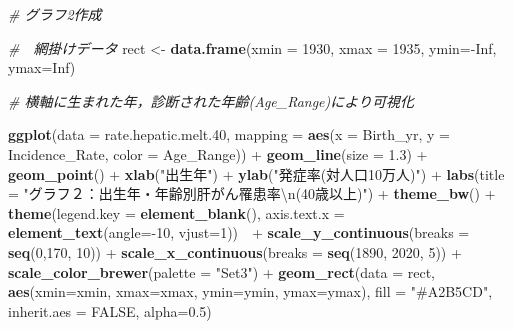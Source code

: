 \documentclass[11pt,]{article}
\newenvironment{Shaded}{\begin{snugshade}}{\end{snugshade}}
\newcommand{\KeywordTok}[1]{\textcolor[rgb]{0.13,0.29,0.53}{\textbf{{#1}}}}
\newcommand{\DataTypeTok}[1]{\textcolor[rgb]{0.13,0.29,0.53}{{#1}}}
\newcommand{\DecValTok}[1]{\textcolor[rgb]{0.00,0.00,0.81}{{#1}}}
\newcommand{\FloatTok}[1]{\textcolor[rgb]{0.00,0.00,0.81}{{#1}}}
\newcommand{\CharTok}[1]{\textcolor[rgb]{0.31,0.60,0.02}{{#1}}}
\newcommand{\StringTok}[1]{\textcolor[rgb]{0.31,0.60,0.02}{{#1}}}
\newcommand{\CommentTok}[1]{\textcolor[rgb]{0.56,0.35,0.01}{\textit{{#1}}}}
\newcommand{\OtherTok}[1]{\textcolor[rgb]{0.56,0.35,0.01}{{#1}}}
\newcommand{\NormalTok}[1]{{#1}}
\begin{document}
\begin{Shaded}
\begin{Highlighting}[]
\CommentTok{#  グラフ2作成}

\CommentTok{#　網掛けデータ}
\NormalTok{rect <-}\StringTok{ }\KeywordTok{data.frame}\NormalTok{(}\DataTypeTok{xmin =} \DecValTok{1930}\NormalTok{, }\DataTypeTok{xmax =} \DecValTok{1935}\NormalTok{, }\DataTypeTok{ymin=}\NormalTok{-}\OtherTok{Inf}\NormalTok{, }\DataTypeTok{ymax=}\OtherTok{Inf}\NormalTok{)}

\CommentTok{#  横軸に生まれた年，診断された年齢(Age_Range)により可視化}

\KeywordTok{ggplot}\NormalTok{(}\DataTypeTok{data =} \NormalTok{rate.hepatic.melt}\FloatTok{.40}\NormalTok{,}
       \DataTypeTok{mapping =} \KeywordTok{aes}\NormalTok{(}\DataTypeTok{x =} \NormalTok{Birth_yr, }\DataTypeTok{y =} \NormalTok{Incidence_Rate,}
                     \DataTypeTok{color =} \NormalTok{Age_Range)) +}\StringTok{ }
\StringTok{  }\KeywordTok{geom_line}\NormalTok{(}\DataTypeTok{size =} \FloatTok{1.3}\NormalTok{) +}
\StringTok{  }\KeywordTok{geom_point}\NormalTok{() +}
\StringTok{    }\KeywordTok{xlab}\NormalTok{(}\StringTok{"出生年"}\NormalTok{) +}\StringTok{ }
\StringTok{    }\KeywordTok{ylab}\NormalTok{(}\StringTok{"発症率(対人口10万人)"}\NormalTok{) +}\StringTok{ }
\StringTok{    }\KeywordTok{labs}\NormalTok{(}\DataTypeTok{title =} 
           \StringTok{"グラフ２：出生年・年齢別肝がん罹患率}\CharTok{\textbackslash{}n}\StringTok{(40歳以上)"}\NormalTok{) +}\StringTok{ }
\StringTok{    }\KeywordTok{theme_bw}\NormalTok{() +}
\StringTok{    }\KeywordTok{theme}\NormalTok{(}\DataTypeTok{legend.key =} \KeywordTok{element_blank}\NormalTok{(),}
          \DataTypeTok{axis.text.x =} \KeywordTok{element_text}\NormalTok{(}\DataTypeTok{angle=}\NormalTok{-}\DecValTok{10}\NormalTok{, }\DataTypeTok{vjust=}\DecValTok{1}\NormalTok{))　+}\StringTok{ }
\StringTok{  }\KeywordTok{scale_y_continuous}\NormalTok{(}\DataTypeTok{breaks =} \KeywordTok{seq}\NormalTok{(}\DecValTok{0}\NormalTok{,}\DecValTok{170}\NormalTok{, }\DecValTok{10}\NormalTok{)) +}\StringTok{ }
\StringTok{  }\KeywordTok{scale_x_continuous}\NormalTok{(}\DataTypeTok{breaks =} \KeywordTok{seq}\NormalTok{(}\DecValTok{1890}\NormalTok{, }\DecValTok{2020}\NormalTok{, }\DecValTok{5}\NormalTok{)) +}
\StringTok{  }\KeywordTok{scale_color_brewer}\NormalTok{(}\DataTypeTok{palette =} \StringTok{"Set3"}\NormalTok{) +}\StringTok{ }
\StringTok{  }\KeywordTok{geom_rect}\NormalTok{(}\DataTypeTok{data =} \NormalTok{rect, }\KeywordTok{aes}\NormalTok{(}\DataTypeTok{xmin=}\NormalTok{xmin, }\DataTypeTok{xmax=}\NormalTok{xmax, }\DataTypeTok{ymin=}\NormalTok{ymin, }\DataTypeTok{ymax=}\NormalTok{ymax), }
            \DataTypeTok{fill =} \StringTok{"#A2B5CD"}\NormalTok{, }\DataTypeTok{inherit.aes =} \OtherTok{FALSE}\NormalTok{, }\DataTypeTok{alpha=}\FloatTok{0.5}\NormalTok{)}
\end{Highlighting}
\end{Shaded}
\end{document}
